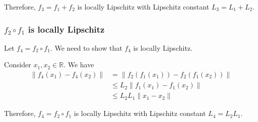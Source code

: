 Therefore, \( f_3 = f_1 + f_2 \) is locally Lipschitz with Lipschitz constant \( L_3 = L_1 + L_2 \).

\subsubsection*{\( f_2 \circ f_1 \) is locally Lipschitz}

Let \( f_4 = f_2 \circ f_1 \).
We need to show that \( f_4 \) is locally Lipschitz.

Consider \( x_1, x_2 \in \mathbb{R} \).
We have
\begin{align*}
    \lVert f_4(x_1) - f_4(x_2) \rVert
     & =
    \lVert f_2(f_1(x_1)) - f_2(f_1(x_2)) \rVert
    \\ & \leq
    L_2 \lVert f_1(x_1) - f_1(x_2) \rVert
    \\ & \leq
    L_2 L_1 \lVert x_1 - x_2 \rVert
\end{align*}

Therefore, \( f_4 = f_2 \circ f_1 \) is locally Lipschitz with Lipschitz constant \( L_4 = L_2 L_1 \).
